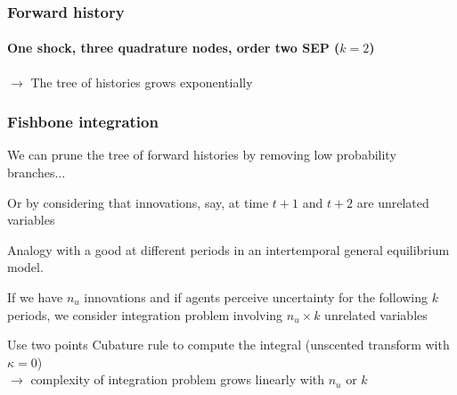 \documentclass[handout,usepdftitle=false,xcolor=dvipsnames,aspectratio=169]{beamer}
\begin{document}
\begin{frame}
  \frametitle{Forward history}
  \framesubtitle{One shock, three quadrature nodes, order two SEP ($k=2$)}
  $\rightarrow$ The tree of histories grows exponentially
\end{frame}

\begin{frame}
  \frametitle{Fishbone integration}
  \begin{witemize}
    \item We can prune the tree of forward histories by removing low probability branches...
    \item Or by considering that innovations, say, at time $t+1$ and $t+2$ are unrelated variables
    \item {\color{gray} Analogy with a good  at different periods in an intertemporal general equilibrium model.}\newline
    \item If we have $n_u$ innovations and if agents perceive uncertainty for the following $k$  periods, we consider integration problem involving $n_u \times k$ unrelated variables
    \item Use two points Cubature rule to compute the integral (unscented transform with $\kappa=0$)\\
    $\rightarrow$ complexity of integration problem grows linearly with $n_u$ or $k$
  \end{witemize}
\end{frame}
\end{document}
